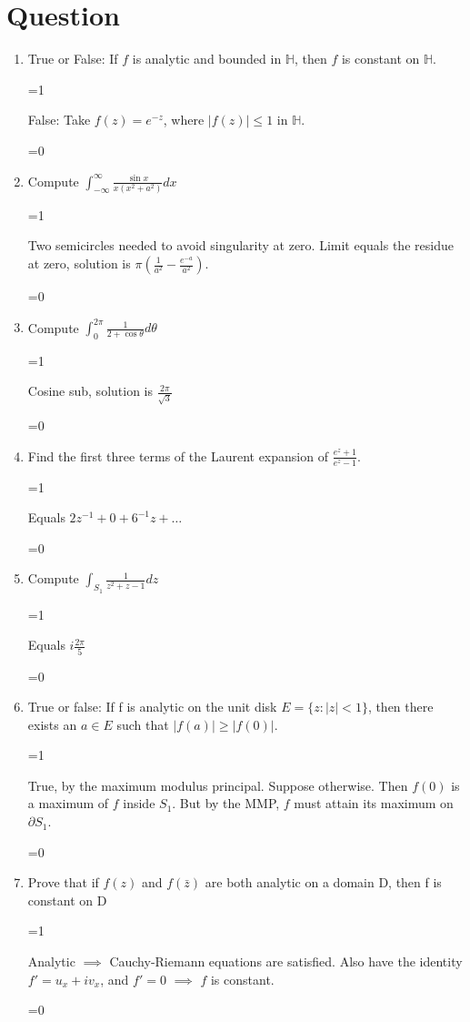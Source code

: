 \documentclass{article}
\def\showanswers{1}
\newcommand{\hide}[1]{
   \ifnum\showanswers=1
 
   #1 \vspace{\baselineskip}
   \fi
 
   \ifnum\showanswers=0
   \vspace{2\baselineskip} \hspace{2cm}
   \fi
}
\begin{document}
\section{Question}
\begin{enumerate}
   \item True or False: If $f$ is analytic and bounded in $\mathbb{H}$, then $f$ is constant on $\mathbb{H}$.
   \hide{
   False: Take $f(z) = e^{-z}$, where $|f(z)| \leq 1$ in $\mathbb{H}$.
   }
 
   \item Compute $\int_{-\infty}^{\infty} \frac{\sin x}{x(x^2+a^2)}dx$
   \hide{
   Two semicircles needed to avoid singularity at zero. Limit equals the residue at zero, solution is $\pi (\frac{1}{a^2} - \frac{e^{-a}}{a^2})$.
   }
   
   \item Compute $\int_0^{2\pi} \frac{1}{2+\cos\theta}d\theta$
   \hide{
   Cosine sub, solution is $\frac{2\pi}{\sqrt{3}}$
   }
   
   \item Find the first three terms of the Laurent expansion of $\frac{e^z+1}{e^z-1}$.
   \hide{
   Equals $2z^{-1} + 0 + 6^{-1}z + \ldots$
   }
   
  \item Compute $\int_{S_1} \frac{1}{z^2+z-1}dz$
   \hide{
    Equals $i\frac{2\pi}{5}$
   }
   
  \item True or false: If f is analytic on the unit disk $E = \{z : |z| < 1\}$, then there exists an $a \in E$ such
  that $|f (a)| \geq |f (0)|$.
   \hide{
   True, by the maximum modulus principal. Suppose otherwise. Then $f(0)$ is a maximum of $f$ inside $S_1$. But by the MMP, $f$ must attain its maximum on $\partial S_1$.
   }
   
   \item Prove that if $f(z)$ and $f (\bar{z})$ are both analytic on a domain D, then f is constant on D
   \hide{
   Analytic $\implies$ Cauchy-Riemann equations are satisfied. Also have the identity $f' = u_x + iv_x$, and $f' = 0$ $\implies$ $f$ is constant.
   }
   
\end{enumerate}
\end{document}
